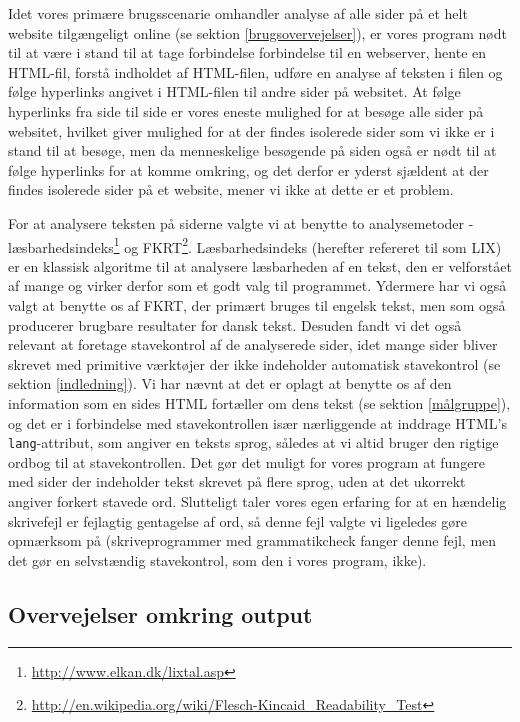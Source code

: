 \documentclass[a4paper,oneside,article]{memoir}
\begin{document}
Idet vores primære brugsscenarie omhandler analyse af alle sider på et
helt website tilgængeligt online (se sektion \ref{brugsovervejelser}),
er vores program nødt til at være i stand til at tage forbindelse
forbindelse til en webserver, hente en HTML-fil, forstå indholdet af
HTML-filen, udføre en analyse af teksten i filen og følge hyperlinks
angivet i HTML-filen til andre sider på websitet. At følge hyperlinks
fra side til side er vores eneste mulighed for at besøge alle sider på
websitet, hvilket giver mulighed for at der findes isolerede sider som
vi ikke er i stand til at besøge, men da menneskelige besøgende på
siden også er nødt til at følge hyperlinks for at komme omkring, og
det derfor er yderst sjældent at der findes isolerede sider på et
website, mener vi ikke at dette er et problem.

For at analysere teksten på siderne valgte vi at benytte to
analysemetoder -
læsbarhedsindeks\footnote{\url{http://www.elkan.dk/lixtal.asp}} og
FKRT\footnote{\url{http://en.wikipedia.org/wiki/Flesch-Kincaid_Readability_Test}}.
Læsbarhedsindeks (herefter refereret til som LIX) er en klassisk
algoritme til at analysere læsbarheden af en tekst, den er velforstået
af mange og virker derfor som et godt valg til programmet. Ydermere
har vi også valgt at benytte os af FKRT, der primært bruges til
engelsk tekst, men som også producerer brugbare resultater for dansk
tekst. Desuden fandt vi det også relevant at foretage stavekontrol af
de analyserede sider, idet mange sider bliver skrevet med primitive
værktøjer der ikke indeholder automatisk stavekontrol (se sektion
\ref{indledning}). Vi har nævnt at det er oplagt at benytte os af den
information som en sides HTML fortæller om dens tekst (se sektion
\ref{målgruppe}), og det er i forbindelse med stavekontrollen især
nærliggende at inddrage HTML's \texttt{lang}-attribut, som angiver en
teksts sprog, således at vi altid bruger den rigtige ordbog til at
stavekontrollen. Det gør det muligt for vores program at fungere med
sider der indeholder tekst skrevet på flere sprog, uden at det
ukorrekt angiver forkert stavede ord. Slutteligt taler vores egen
erfaring for at en hændelig skrivefejl er fejlagtig gentagelse af ord,
så denne fejl valgte vi ligeledes gøre opmærksom på (skriveprogrammer
med grammatikcheck fanger denne fejl, men det gør en selvstændig
stavekontrol, som den i vores program, ikke).

\subsection{Overvejelser omkring output}
\end{document}

